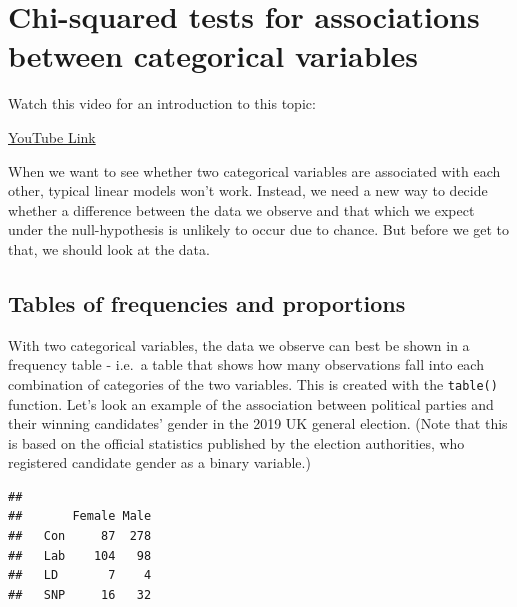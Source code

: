 \documentclass[
]{book}
\newenvironment{Shaded}{\begin{snugshade}}{\end{snugshade}}
\newcommand{\KeywordTok}[1]{\textcolor[rgb]{0.13,0.29,0.53}{\textbf{#1}}}
\newcommand{\NormalTok}[1]{#1}
\newcommand{\OperatorTok}[1]{\textcolor[rgb]{0.81,0.36,0.00}{\textbf{#1}}}
\begin{document}
\hypertarget{chi-squared-tests-for-associations-between-categorical-variables}{%
\chapter{Chi-squared tests for associations between categorical variables}\label{chi-squared-tests-for-associations-between-categorical-variables}}

Watch this video for an introduction to this topic:

\textcolor{blue}{\href{https://www.youtube.com/embed/h1oq6HjlyjI?rel=0&modestbranding=1&loop=1&playlist=sk7TT5qM5Hw}{YouTube Link}}

When we want to see whether two categorical variables are associated with each other, typical linear models won't work. Instead, we need a new way to decide whether a difference between the data we observe and that which we expect under the null-hypothesis is unlikely to occur due to chance. But before we get to that, we should look at the data.

\hypertarget{tables-of-frequencies-and-proportions}{%
\section{Tables of frequencies and proportions}\label{tables-of-frequencies-and-proportions}}

With two categorical variables, the data we observe can best be shown in a frequency table - i.e.~a table that shows how many observations fall into each combination of categories of the two variables. This is created with the \texttt{table()} function. Let's look an example of the association between political parties and their winning candidates' gender in the 2019 UK general election. (Note that this is based on the official statistics published by the election authorities, who registered candidate gender as a binary variable.)

\begin{Shaded}
\end{Shaded}

\begin{verbatim}
##      
##       Female Male
##   Con     87  278
##   Lab    104   98
##   LD       7    4
##   SNP     16   32
\end{verbatim}
\end{document}
